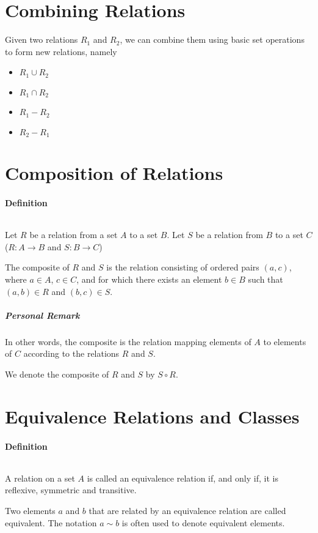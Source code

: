 \documentclass[10pt,a4paper]{book}
\begin{document}
\section{Combining Relations}
Given two relations $R_1$ and $R_2$, we can combine them using basic set operations to form new relations, namely
\begin{itemize}
\item $R_1 \cup R_2$
\item $R_1 \cap R_2$
\item $R_1 - R_2$
\item $R_2 - R_1$
\end{itemize}

\section{Composition of Relations}
\paragraph*{Definition}
$\ $\par
Let $R$ be a relation from a set $A$ to a set $B$. Let $S$ be a relation from $B$ to a set $C$ ($R : A \to B$ and $S : B \to C$)\par
The composite of $R$ and $S$ is the relation consisting of ordered pairs $(a,c)$, where $a \in A$, $c \in C$, and for which there exists an element $b \in B$ such that $(a,b) \in R$ and $(b,c) \in S$.
\subparagraph*{Personal Remark}
In other words, the composite is the relation mapping elements of $A$ to elements of $C$ according to the relations $R$ and $S$.\par
$\ $\\
We denote the composite of $R$ and $S$ by $S \circ R$.

\section{Equivalence Relations and Classes}
\paragraph*{Definition}
$\ $\par
A relation on a set $A$ is called an equivalence relation if, and only if, it is reflexive, symmetric and transitive.\par
Two elements $a$ and $b$ that are related by an equivalence relation are called equivalent. The notation $a \sim b$ is often used to denote equivalent elements.
\end{document}
